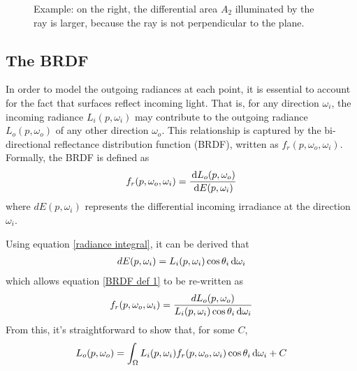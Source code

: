 \begin{figure}[H]
    

\caption{Example: on the right, the differential area $A_2$ illuminated by the ray is larger, because the ray is not perpendicular to the plane.}    
\end{figure}


\subsection{The BRDF}

In order to model the outgoing radiances at each point, it is essential to account for the fact that surfaces reflect incoming light. That is, for any direction $\omega_i$, the incoming radiance $L_i(p,\omega_i)$ may contribute to the outgoing radiance $L_o(p,\omega_o)$ of any other direction $\omega_o$. This relationship is captured by the bi-directional reflectance distribution function (BRDF), written as $f_r(p,\omega_o,\omega_i)$. Formally, the BRDF is defined as 
\begin{align}
    f_r(p,\omega_o,\omega_i) = \frac{\,\mathrm{d} L_o(p,\omega_o)}{\,\mathrm{d} E(p,\omega_i)}
    \label{BRDF def 1}
\end{align}
where $dE(p,\omega_i)$ represents the differential incoming irradiance at the direction $\omega_i$.

Using equation \ref{radiance integral}, it can be derived that 
\begin{align}
    dE(p,\omega_i) = L_i(p,\omega_i)\cos\theta_i\,\mathrm{d}\omega_i
\end{align}
which allows equation \ref{BRDF def 1} to be re-written as
\begin{align}
    f_r(p,\omega_o,\omega_i) = \frac{dL_o(p,\omega_o)}{L_i(p,\omega_i)\cos\theta_i\,\mathrm{d}\omega_i}
\end{align}
From this, it's straightforward to show that, for some $C$,
\begin{align}
    L_o(p,\omega_o) = \int_\Omega L_i(p,\omega_i)f_r(p,\omega_o,\omega_i)\cos\theta_i\,\mathrm{d}\omega_i + C
    \label{reflection plus C}
\end{align}

